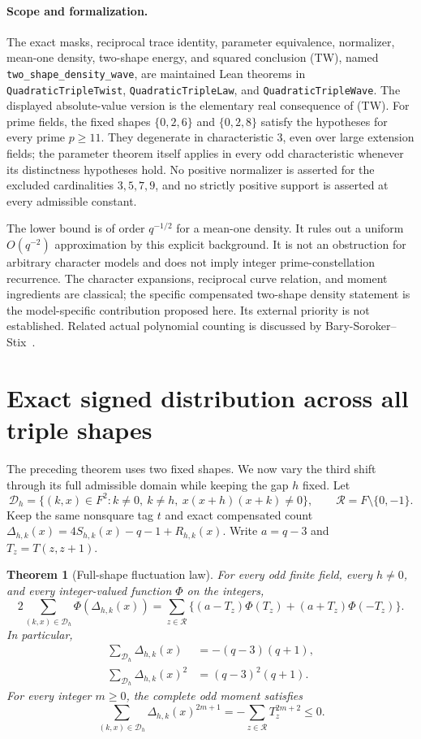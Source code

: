 \documentclass[11pt]{article}
\newtheorem{theorem}{Theorem}[section]
\begin{document}
\paragraph{Scope and formalization.}
The exact masks, reciprocal trace identity, parameter equivalence,
normalizer, mean-one density, two-shape energy, and squared conclusion
(TW), named \texttt{two\_shape\_density\_wave}, are maintained Lean theorems in
\texttt{QuadraticTripleTwist}, \texttt{QuadraticTripleLaw}, and
\texttt{QuadraticTripleWave}. The displayed absolute-value version is
the elementary real consequence of (TW).
For prime fields, the fixed shapes \(\{0,2,6\}\) and \(\{0,2,8\}\)
satisfy the hypotheses for every prime \(p\ge11\). They degenerate
in characteristic \(3\), even over large extension fields; the
parameter theorem itself applies in every odd characteristic whenever
its distinctness hypotheses hold. No positive normalizer is asserted
for the excluded cardinalities \(3,5,7,9\), and no strictly positive
support is asserted at every admissible constant.

The lower bound is of order \(q^{-1/2}\) for a mean-one density.
It rules out a uniform \(O(q^{-2})\) approximation by this explicit
background. It is not an obstruction for arbitrary character models
and does not imply integer prime-constellation recurrence.
The character expansions, reciprocal curve relation, and moment
ingredients are classical; the specific compensated two-shape density
statement is the model-specific contribution proposed here.
Its external priority is not established. Related actual polynomial
counting is discussed by Bary-Soroker--Stix~\cite{BarySorokerStix}.

\section{Exact signed distribution across all triple shapes}

The preceding theorem uses two fixed shapes. We now vary the third
shift through its full admissible domain while keeping the gap \(h\)
fixed. Let
\[
 \mathcal D_h=\{(k,x)\in F^2:k\ne0,\ k\ne h,\
                         x(x+h)(x+k)\ne0\},\qquad
 \mathcal R=F\setminus\{0,-1\}.
\]
Keep the same nonsquare tag \(t\) and exact compensated count
\(\Delta_{h,k}(x)=4S_{h,k}(x)-q-1+R_{h,k}(x)\).
Write \(a=q-3\) and \(T_z=T(z,z+1)\).

\begin{theorem}[Full-shape fluctuation law]\label{thm:tripleFluctuation}
For every odd finite field, every \(h\ne0\), and every
integer-valued function \(\Phi\) on the integers,
\[
 2\sum_{(k,x)\in\mathcal D_h}\Phi(\Delta_{h,k}(x))
  =\sum_{z\in\mathcal R}
       \{(a-T_z)\Phi(T_z)+(a+T_z)\Phi(-T_z)\}.
 \tag{TF}
\]
In particular,
\[
 \begin{split}
 \sum_{\mathcal D_h}\Delta_{h,k}(x)&=-(q-3)(q+1),\\
 \sum_{\mathcal D_h}\Delta_{h,k}(x)^2&=(q-3)^2(q+1).
 \end{split}
\]
For every integer \(m\ge0\), the complete odd moment satisfies
\[
 \sum_{(k,x)\in\mathcal D_h}\Delta_{h,k}(x)^{2m+1}
       =-\sum_{z\in\mathcal R}T_z^{2m+2}\le0.
 \tag{TO}
\]
\end{theorem}
\end{document}
